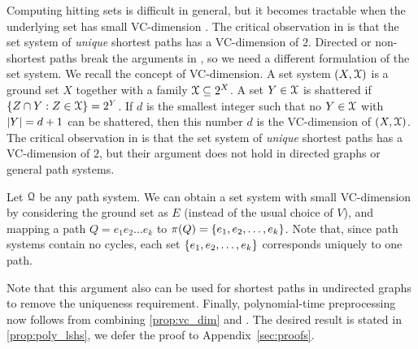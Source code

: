 Computing hitting sets is difficult in general, but it becomes tractable when the underlying set has small VC-dimension \cite{vc_dim_hitting}.
The critical observation in \cite{highway2013} is that the set system of \emph{unique} shortest paths has a VC-dimension of $2$.
Directed or non-shortest paths break the arguments in \cite{highway2013}, so we need a different formulation of the set system.
We recall the concept of VC-dimension.
A set system $(X,\mathcal{X})$ is a ground set $X$ together with a family $\mathcal{X}\subseteq 2^X$.
A set $Y\in \mathcal{X}$ is shattered if $\{Z\cap Y:Z\in\mathcal{X}\}=2^Y$.
If $d$ is the smallest integer such that no $Y\in\mathcal{X}$ with $\lvert Y\rvert=d+1$ can be shattered, then this number $d$ is the VC-dimension of $(X,\mathcal{X})$.
The critical observation in \cite{highway2013} is that the set system of \emph{unique} shortest paths has a VC-dimension of $2$, but their argument does not hold in directed graphs or general path systems.

Let $\mathcal{Q}$ be any path system.
We can obtain a set system with small VC-dimension by considering the ground set as $E$ (instead of the usual choice of $V$), and mapping a path $Q=e_1e_2\ldots e_k$ to $\pi(Q)=\{e_1,e_2,\ldots,e_k\}$.
Note that, since path systems contain no cycles, each set $\{e_1,e_2,\ldots,e_k\}$ corresponds uniquely to one path.
Note that this argument also can be used for shortest paths in undirected graphs to remove the uniqueness requirement.
Finally, polynomial-time preprocessing now follows from combining \cref{prop:vc_dim} and \cite{vc_dim_hitting}.
The desired result is stated in \cref{prop:poly_lshs}, we defer the proof to Appendix~\ref{sec:proofs}.

